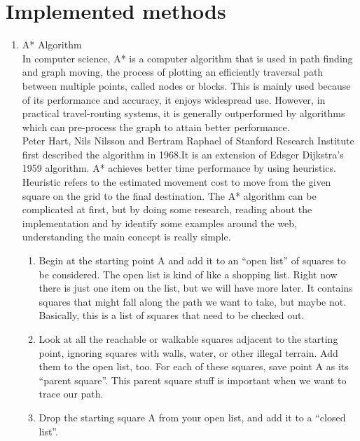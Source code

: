 \documentclass[twocolumn]{IEEEtran}
\begin{document}
\section{Implemented methods} 
	\begin{enumerate}
    
    \item A* Algorithm\\
    
    In computer science, A* is a computer algorithm that is used in path finding and graph moving, the process of plotting an efficiently traversal path between multiple points, called nodes or blocks. This is mainly used because of its performance and accuracy, it enjoys widespread use. However, in practical travel-routing systems, it is generally outperformed by algorithms which can pre-process the graph to attain better performance.\\

Peter Hart, Nils Nilsson and Bertram Raphael of Stanford Research Institute first described the algorithm in 1968.It is an extension of Edsger Dijkstra's 1959 algorithm. A* achieves better time performance by using heuristics. Heuristic refers to the estimated movement cost to move from the given square on the grid to the final destination. The A* algorithm can be complicated at first, but by doing some research, reading about the implementation and by identify some examples around the web, understanding the main concept is really simple.\\

	\begin{enumerate}
    
	\item Begin at the starting point A and add it to an “open list” of squares to be considered. The open list is kind of like a shopping list. Right now there is just one item on the list, but we will have more later. It contains squares that might fall along the path we want to take, but maybe not. Basically, this is a list of squares that need to be checked out.
    
    \item Look at all the reachable or walkable squares adjacent to the starting point, ignoring squares with walls, water, or other illegal terrain. Add them to the open list, too. For each of these squares, save point A as its “parent square”. This parent square stuff is important when we want to trace our path.
    
    \item Drop the starting square A from your open list, and add it to a “closed list”.
    

\end{enumerate}
\end{enumerate}
\end{document}
